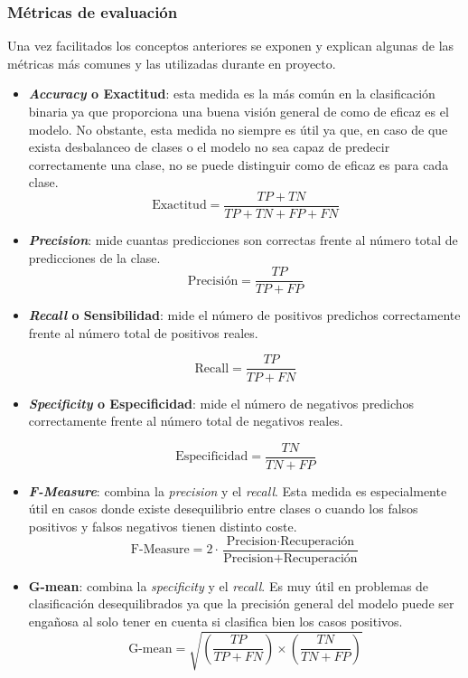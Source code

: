 \subsubsection{Métricas de evaluación}
Una vez facilitados los conceptos anteriores se exponen y explican algunas de las métricas más comunes y las utilizadas durante en proyecto.
\begin{itemize}

\item \textbf{\textit{Accuracy} o Exactitud}: esta medida es la más común en la clasificación binaria ya que proporciona una buena visión general de como de eficaz es el modelo. No obstante, esta medida no siempre es útil ya que, en caso de que exista desbalanceo de clases o el modelo no sea capaz de predecir correctamente una clase, no se puede distinguir como de eficaz es para cada clase.
\begin{equation}
\text{Exactitud} = \frac{TP + TN}{TP + TN + FP + FN}
\end{equation}
\item \textbf{\textit{Precision}}: mide cuantas predicciones son correctas frente al número total de predicciones de la clase.
\begin{equation}
\text{Precisión} = \frac{TP}{TP + FP}
\end{equation}
\item \textbf{\textit{Recall} o Sensibilidad}: mide el número de positivos predichos correctamente  frente al número total de positivos reales.

\begin{equation}
\text{Recall} = \frac{TP}{TP + FN}
\end{equation}
\item \textbf{\textit{Specificity} o Especificidad}: mide el número de negativos predichos correctamente  frente al número total de negativos reales.

\begin{equation}
\text{Especificidad} = \frac{TN}{TN + FP}
\end{equation}
\item \textbf{\textit{F-Measure}}: combina la \textit{precision} y el \textit{recall}. Esta medida es especialmente útil en casos donde existe desequilibrio entre clases o cuando los falsos positivos y falsos negativos tienen distinto coste.
\begin{equation}
\text{F-Measure} = 2 \cdot \frac{\text{Precision} \cdot \text{Recuperación}}{\text{Precision} + \text{Recuperación}}
\end{equation}

\item \textbf{G-mean}: combina la \textit{specificity} y el \textit{recall}. Es muy útil en problemas de clasificación desequilibrados ya que la precisión general del modelo puede ser engañosa al solo tener en cuenta si clasifica bien los casos positivos.
\begin{equation}
\text{G-mean} = \sqrt{\left( \frac{TP}{TP + FN} \right) \times \left( \frac{TN}{TN + FP} \right)}
\end{equation}

\end{itemize} 

